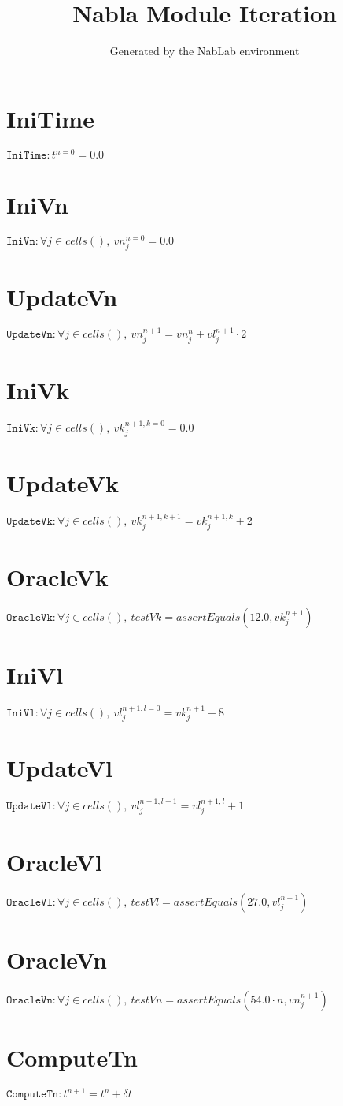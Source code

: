\documentclass[11pt]{article}
\title{Nabla Module Iteration}
\author{Generated by the NabLab environment}
\begin{document}
\maketitle


\section{IniTime}
$\texttt{IniTime} : t^{n=0} = 0.0$


\section{IniVn}
$\texttt{IniVn} : \forall{j\in cells()}, \ vn^{n=0}_{j} = 0.0$


\section{UpdateVn}
$\texttt{UpdateVn} : \forall{j\in cells()}, \ vn^{n+1}_{j} = vn^{n}_{j} + vl^{n+1}_{j} \cdot 2$


\section{IniVk}
$\texttt{IniVk} : \forall{j\in cells()}, \ vk^{n+1, k=0}_{j} = 0.0$


\section{UpdateVk}
$\texttt{UpdateVk} : \forall{j\in cells()}, \ vk^{n+1, k+1}_{j} = vk^{n+1, k}_{j} + 2$


\section{OracleVk}
$\texttt{OracleVk} : \forall{j\in cells()}, \ testVk=assertEquals\left(12.0,vk^{n+1}_{j}\right)$


\section{IniVl}
$\texttt{IniVl} : \forall{j\in cells()}, \ vl^{n+1, l=0}_{j} = vk^{n+1}_{j} + 8$


\section{UpdateVl}
$\texttt{UpdateVl} : \forall{j\in cells()}, \ vl^{n+1, l+1}_{j} = vl^{n+1, l}_{j} + 1$


\section{OracleVl}
$\texttt{OracleVl} : \forall{j\in cells()}, \ testVl=assertEquals\left(27.0,vl^{n+1}_{j}\right)$


\section{OracleVn}
$\texttt{OracleVn} : \forall{j\in cells()}, \ testVn=assertEquals\left(54.0 \cdot n,vn^{n+1}_{j}\right)$


\section{ComputeTn}
$\texttt{ComputeTn} : t^{n+1} = t^{n} + \delta t$
\end{document}
